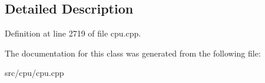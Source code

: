 \subsection{Detailed Description}


Definition at line 2719 of file cpu.\-cpp.



The documentation for this class was generated from the following file\-:\begin{DoxyCompactItemize}
\item 
src/cpu/cpu.\-cpp\end{DoxyCompactItemize}

